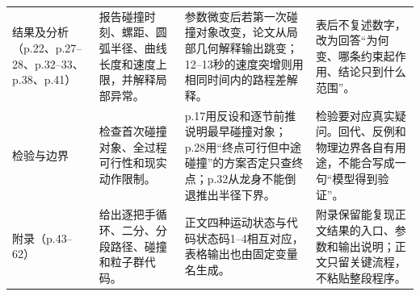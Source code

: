 \begin{longtable}{p{2.25cm}p{4.0cm}p{5.1cm}p{4.2cm}}
结果及分析（p.22、p.27--28、p.32--33、p.38、p.41）
& 报告碰撞时刻、螺距、圆弧半径、曲线长度和速度上限，并解释局部异常。
& 参数微变后若第一次碰撞对象改变，论文从局部几何解释输出跳变；12--13秒的速度突增则用相同时间内的路程差解释。
& 表后不复述数字，改为回答“为何变、哪条约束起作用、结论只到什么范围”。\\

检验与边界
& 检查首次碰撞对象、全过程可行性和现实动作限制。
& p.17用反设和逐节前推说明最早碰撞对象；p.28用“终点可行但中途碰撞”的方案否定只查终点；p.32从龙身不能倒退推出半径下界。
& 检验要对应真实疑问。回代、反例和物理边界各自有用途，不能合写成一句“模型得到验证”。\\

附录（p.43--62）
& 给出逐把手循环、二分、分段路径、碰撞和粒子群代码。
& 正文四种运动状态与代码状态码1--4相互对应，表格输出也由固定变量名生成。
& 附录保留能复现正文结果的入口、参数和输出说明；正文只留关键流程，不粘贴整段程序。\\
\end{longtable}
\normalsize

